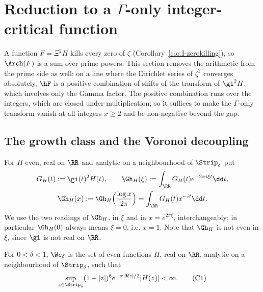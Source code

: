 \section{Reduction to a \texorpdfstring{$\Gamma$}{Gamma}-only integer-critical function}\label{sec:reduction}

A function $F=\Xi^2H$ kills every zero of $\zeta$ (Corollary~\ref{cor:I-zerokilling}), so $\Arch(F)$ is a sum over prime powers. This
section removes the arithmetic from the prime side as well: on a line where the Dirichlet series of $\zeta^2$ converges absolutely, $\hF$
is a positive combination of shifts of the transform of $\gi^2H$, which involves only the Gamma factor. The positive combination runs over
the integers, which are closed under multiplication; so it suffices to make the $\Gamma$-only transform vanish at all integers $x\ge2$ and be
non-negative beyond the gap.

\subsection{The growth class and the Voronoi decoupling}

For $H$ even, real on $\RR$ and analytic on a neighbourhood of $\Strip_\delta$ put
\begin{equation}\label{eq:GH}
\begin{gathered}
G_H(t):=\gi(t)^2H(t),\qquad \Gh_H(\xi):=\int_\RR G_H(t)e^{-2\pi i\xi t}\dd t,\\
\Gh_H(x):=\Gh_H\Big(\frac{\log x}{2\pi}\Big)=\int_\RR G_H(t)x^{-it}\dd t .
\end{gathered}
\end{equation}
We use the two readings of $\Gh_H$, in $\xi$ and in $x=e^{2\pi\xi}$, interchangeably; in particular $\Gh_H(0)$ always means $\xi=0$, i.e.
$x=1$. Note that $\Gh_H$ is not even in $\xi$, since $\gi$ is not real on $\RR$.

\begin{definition}\label{def:W}
For $0<\delta<1$, $\Wc_\delta$ is the set of even functions $H$, real on $\RR$, analytic on a neighbourhood of $\Strip_\delta$, such that
\begin{equation*}
\sup_{z\in \Strip_\delta}(1+|z|)^8e^{-\pi|\Re z|/2}|H(z)|<\infty .\tag{C1}\label{eq:C1}
\end{equation*}
\end{definition}


